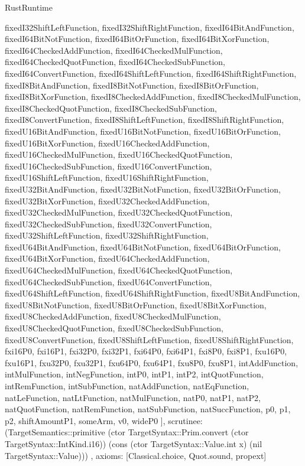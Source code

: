 \begin{lexlean}{RustRuntime}
\begin{semanticmodule}
{{      fixedI32ShiftLeftFunction,
      fixedI32ShiftRightFunction,
      fixedI64BitAndFunction,
      fixedI64BitNotFunction,
      fixedI64BitOrFunction,
      fixedI64BitXorFunction,
      fixedI64CheckedAddFunction,
      fixedI64CheckedMulFunction,
      fixedI64CheckedQuotFunction,
      fixedI64CheckedSubFunction,
      fixedI64ConvertFunction,
      fixedI64ShiftLeftFunction,
      fixedI64ShiftRightFunction,
      fixedI8BitAndFunction,
      fixedI8BitNotFunction,
      fixedI8BitOrFunction,
      fixedI8BitXorFunction,
      fixedI8CheckedAddFunction,
      fixedI8CheckedMulFunction,
      fixedI8CheckedQuotFunction,
      fixedI8CheckedSubFunction,
      fixedI8ConvertFunction,
      fixedI8ShiftLeftFunction,
      fixedI8ShiftRightFunction,
      fixedU16BitAndFunction,
      fixedU16BitNotFunction,
      fixedU16BitOrFunction,
      fixedU16BitXorFunction,
      fixedU16CheckedAddFunction,
      fixedU16CheckedMulFunction,
      fixedU16CheckedQuotFunction,
      fixedU16CheckedSubFunction,
      fixedU16ConvertFunction,
      fixedU16ShiftLeftFunction,
      fixedU16ShiftRightFunction,
      fixedU32BitAndFunction,
      fixedU32BitNotFunction,
      fixedU32BitOrFunction,
      fixedU32BitXorFunction,
      fixedU32CheckedAddFunction,
      fixedU32CheckedMulFunction,
      fixedU32CheckedQuotFunction,
      fixedU32CheckedSubFunction,
      fixedU32ConvertFunction,
      fixedU32ShiftLeftFunction,
      fixedU32ShiftRightFunction,
      fixedU64BitAndFunction,
      fixedU64BitNotFunction,
      fixedU64BitOrFunction,
      fixedU64BitXorFunction,
      fixedU64CheckedAddFunction,
      fixedU64CheckedMulFunction,
      fixedU64CheckedQuotFunction,
      fixedU64CheckedSubFunction,
      fixedU64ConvertFunction,
      fixedU64ShiftLeftFunction,
      fixedU64ShiftRightFunction,
      fixedU8BitAndFunction,
      fixedU8BitNotFunction,
      fixedU8BitOrFunction,
      fixedU8BitXorFunction,
      fixedU8CheckedAddFunction,
      fixedU8CheckedMulFunction,
      fixedU8CheckedQuotFunction,
      fixedU8CheckedSubFunction,
      fixedU8ConvertFunction,
      fixedU8ShiftLeftFunction,
      fixedU8ShiftRightFunction,
      fxi16P0,
      fxi16P1,
      fxi32P0,
      fxi32P1,
      fxi64P0,
      fxi64P1,
      fxi8P0,
      fxi8P1,
      fxu16P0,
      fxu16P1,
      fxu32P0,
      fxu32P1,
      fxu64P0,
      fxu64P1,
      fxu8P0,
      fxu8P1,
      intAddFunction,
      intMulFunction,
      intNegFunction,
      intP0,
      intP1,
      intP2,
      intQuotFunction,
      intRemFunction,
      intSubFunction,
      natAddFunction,
      natEqFunction,
      natLeFunction,
      natLtFunction,
      natMulFunction,
      natP0,
      natP1,
      natP2,
      natQuotFunction,
      natRemFunction,
      natSubFunction,
      natSuccFunction,
      p0,
      p1,
      p2,
      shiftAmountP1,
      someArm,
      v0,
      wideP0
    ],
    scrutinee: (TargetSemantics::primitive (ctor TargetSyntax::Prim.convert (ctor TargetSyntax::IntKind.i16)) (cons (ctor TargetSyntax::Value.int x) (nil TargetSyntax::Value)))
  },
  axioms: [Classical.choice, Quot.sound, propext]
}


\end{semanticmodule}
\end{lexlean}
